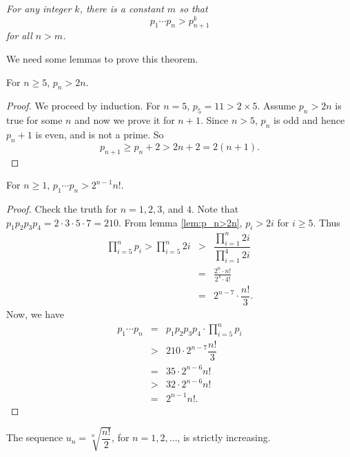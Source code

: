 \documentclass{subfiles}
\begin{document}
	\begin{theorem}\sl
		\label{thm:posa}
		For any integer $k$, there is a constant $m$ so that \[p_1\cdots p_n>p_{n+1}^k\]
		for all $n>m$.
	\end{theorem}

	We need some lemmas to prove this theorem.

	\begin{lemma}
		For $n\geq 5$, $p_n>2n$.\label{lem:p_n>2n}
	\end{lemma}

	\begin{proof}
		We proceed by induction. For $n=5$, $p_5=11>2 \times 5$. Assume $p_n >2n$ is true for some $n$ and now we prove it for $n+1$. Since $n>5$, $p_n$ is odd and hence $p_n+1$ is even, and is not a prime. So
		\[p_{n+1}\geq p_n+2>2n+2=2(n+1).\]
	\end{proof}

	\begin{lemma}
		For $n\geq1$, $p_1\cdots p_n> 2^{n-1}n!$.\label{lem:p_1p_2...p_n>2^{n-1}n!}
	\end{lemma}

	\begin{proof}
		Check the truth for $n=1,2,3$, and $4$. Note that $p_1p_2p_3p_4=2\cdot3\cdot5\cdot7=210$. From lemma \eqref{lem:p_n>2n}, $p_i>2i$ for $i\geq5$. Thus
			\begin{eqnarray*}
				\prod_{i=5}^np_i > \prod_{i=5}^n2i & > & \dfrac{\prod_{i=1}^n 2i}{\prod_{i=1}^4 2i}\\
												   & = & \frac{2^n \cdot n!}{2^4\cdot 4!}\\
												   & = & 2^{n-7}\cdot \dfrac{n!}{3}.
			\end{eqnarray*}
		Now, we have
			\begin{eqnarray*}
				p_1\cdots p_n & = & p_1p_2p_3p_4\cdot \prod_{i=5}^np_i \\
						   	  & > & 210\cdot2^{n-7}\dfrac{n!}{3}\\
							  & = & 35 \cdot2^{n-6}n!\\
							  & > & 32 \cdot 2^{n-6}n!\\
							  & = & 2^{n-1}n!.
			\end{eqnarray*}
	\end{proof}

	\begin{lemma}
		The sequence $u_n=\sqrt[n]{\dfrac{n!}{2}}$, for $n=1,2,\ldots$, is strictly increasing.\label{lem:n!/2}
	\end{lemma}
\end{document}
